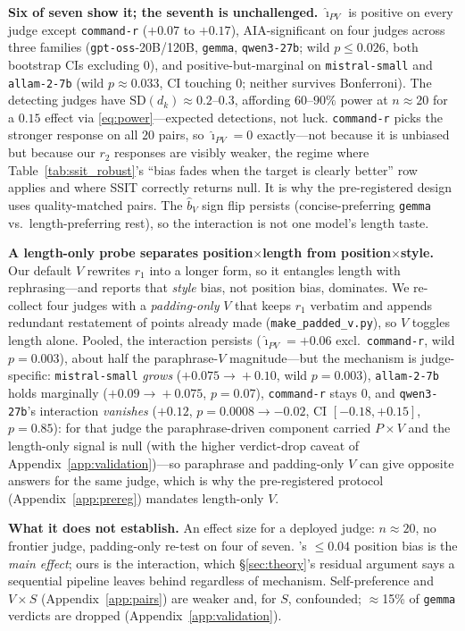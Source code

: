 \documentclass{article}
\begin{document}
\textbf{Six of seven show it; the seventh is unchallenged.}
$\hat\imath_{PV}$ is positive on every judge except \texttt{command-r}
($+0.07$ to $+0.17$), AIA-significant on four judges across three
families (\texttt{gpt-oss}-20B/120B, \texttt{gemma},
\texttt{qwen3-27b}; wild $p\leq0.026$, both bootstrap CIs excluding
0), and
positive-but-marginal on \texttt{mistral-small} and
\texttt{allam-2-7b} (wild $p\approx0.033$, CI touching 0; neither
survives Bonferroni). The detecting judges have
$\mathrm{SD}(d_k)\approx0.2$--$0.3$, affording $60$--$90\%$ power at
$n{\approx}20$ for a $0.15$ effect via \eqref{eq:power}---expected
detections, not luck.
\texttt{command-r} picks the stronger response on all $20$ pairs, so
$\hat\imath_{PV}{=}0$ exactly---not because it is unbiased but
because our $r_2$ responses are visibly weaker, the regime where
Table~\ref{tab:ssit_robust}'s ``bias fades when the target is
clearly better'' row applies and where SSIT correctly returns null.
It is why the pre-registered design uses quality-matched pairs. The
$\hat b_V$ sign flip persists (concise-preferring \texttt{gemma}
vs.\ length-preferring rest), so the interaction is not one model's
length taste.

\textbf{A length-only probe separates position$\times$length from
position$\times$style.} Our default $V$ rewrites $r_1$ into a longer
form, so it entangles length with rephrasing---and
\cite{mitigation2026} reports that \emph{style} bias, not position
bias, dominates. We re-collect four judges with a \emph{padding-only}
$V$ that keeps $r_1$ verbatim and appends redundant restatement of
points already made (\texttt{make\_padded\_v.py}), so $V$ toggles
length alone. Pooled, the interaction persists
($\hat\imath_{PV}{=}{+}0.06$ excl.\ \texttt{command-r}, wild
$p{=}0.003$), about half the paraphrase-$V$ magnitude---but the
mechanism is judge-specific: \texttt{mistral-small} \emph{grows}
($+0.075\!\to\!+0.10$, wild $p{=}0.003$), \texttt{allam-2-7b} holds
marginally ($+0.09\!\to\!+0.075$, $p{=}0.07$), \texttt{command-r}
stays $0$, and \texttt{qwen3-27b}'s interaction \emph{vanishes}
($+0.12$, $p{=}0.0008\to-0.02$, CI $[-0.18,+0.15]$, $p{=}0.85$): for
that judge the paraphrase-driven component carried $P{\times}V$ and
the length-only signal is null (with the higher verdict-drop caveat
of Appendix~\ref{app:validation})---so paraphrase and padding-only
$V$ can give opposite answers for the same judge, which is why the
pre-registered protocol (Appendix~\ref{app:prereg}) mandates
length-only $V$.

\textbf{What it does not establish.} An effect size for a deployed
judge: $n{\approx}20$, no frontier judge, padding-only re-test on
four of seven. \cite{mitigation2026}'s $\leq0.04$ position bias is
the \emph{main effect}; ours is the interaction, which
\S\ref{sec:theory}'s residual argument says a sequential pipeline
leaves behind regardless of mechanism. Self-preference and
$V{\times}S$ (Appendix~\ref{app:pairs}) are weaker and, for $S$,
confounded; $\approx$15\% of \texttt{gemma} verdicts are dropped
(Appendix~\ref{app:validation}).
\end{document}
